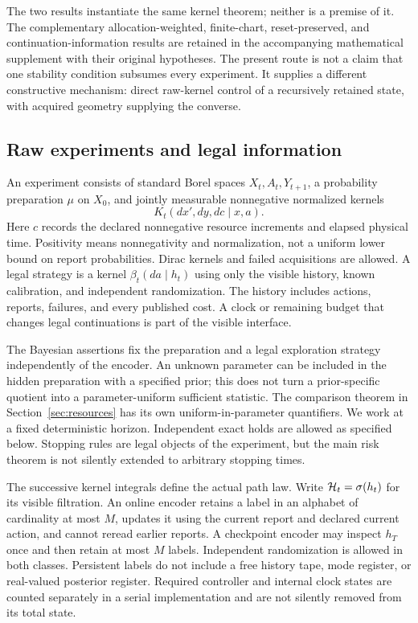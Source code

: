 The two results instantiate the same kernel theorem; neither is a premise of it. The complementary allocation-weighted, finite-chart, reset-preserved, and continuation-information results are retained in the accompanying mathematical supplement with their original hypotheses. The present route is not a claim that one stability condition subsumes every experiment. It supplies a different constructive mechanism: direct raw-kernel control of a recursively retained state, with acquired geometry supplying the converse.

\subsection{Raw experiments and legal information}
An experiment consists of standard Borel spaces $X_t,A_t,Y_{t+1}$, a probability preparation $\mu$ on $X_0$, and jointly measurable nonnegative normalized kernels
\begin{equation}\label{eq:raw}
 K_t(dx',dy,dc\mid x,a).
\end{equation}
Here $c$ records the declared nonnegative resource increments and elapsed physical time. Positivity means nonnegativity and normalization, not a uniform lower bound on report probabilities. Dirac kernels and failed acquisitions are allowed. A legal strategy is a kernel $\beta_t(da\mid h_t)$ using only the visible history, known calibration, and independent randomization. The history includes actions, reports, failures, and every published cost. A clock or remaining budget that changes legal continuations is part of the visible interface.

The Bayesian assertions fix the preparation and a legal exploration strategy independently of the encoder. An unknown parameter can be included in the hidden preparation with a specified prior; this does not turn a prior-specific quotient into a parameter-uniform sufficient statistic. The comparison theorem in Section~\ref{sec:resources} has its own uniform-in-parameter quantifiers. We work at a fixed deterministic horizon. Independent exact holds are allowed as specified below. Stopping rules are legal objects of the experiment, but the main risk theorem is not silently extended to arbitrary stopping times.

The successive kernel integrals define the actual path law. Write $\mathcal H_t=\sigma(h_t)$ for its visible filtration. An online encoder retains a label in an alphabet of cardinality at most $M$, updates it using the current report and declared current action, and cannot reread earlier reports. A checkpoint encoder may inspect $h_T$ once and then retain at most $M$ labels. Independent randomization is allowed in both classes. Persistent labels do not include a free history tape, mode register, or real-valued posterior register. Required controller and internal clock states are counted separately in a serial implementation and are not silently removed from its total state.

